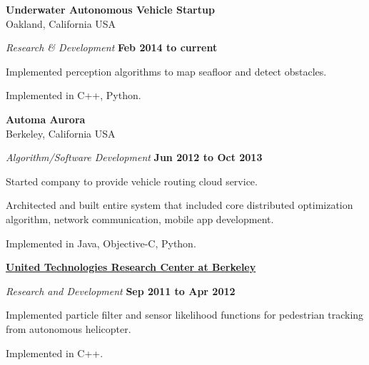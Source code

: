 \textbf{Underwater Autonomous Vehicle Startup}\\
Oakland, California USA
\begin{outerlist}
\item[] \textit{Research \& Development}%
        \hfill \textbf{Feb 2014 to current}
\begin{innerlist}
\item Implemented perception algorithms to map seafloor and detect obstacles.
\item Implemented in C++, Python.
\end{innerlist}
\end{outerlist}

\halfblankline

\textbf{Automa Aurora}\\
Berkeley, California USA
\begin{outerlist}
\item[] \textit{Algorithm/Software Development}%
        \hfill \textbf{Jun 2012 to Oct 2013}
\begin{innerlist}
\item Started company to provide vehicle routing cloud service.
\item Architected and built entire system that included core distributed optimization algorithm, network communication, mobile app development.
\item Implemented in Java, Objective-C, Python.
\end{innerlist}
\end{outerlist}

\halfblankline

\href{http://www.utrc.utc.com/}{\textbf{United Technologies Research Center at Berkeley}}
\begin{outerlist}
\item[] \textit{Research and Development}%
        \hfill \textbf{Sep 2011 to Apr 2012}
\begin{innerlist}
\item Implemented particle filter and sensor likelihood functions for pedestrian tracking from autonomous helicopter.
\item Implemented in C++.
\end{innerlist}
\end{outerlist}

\halfblankline

